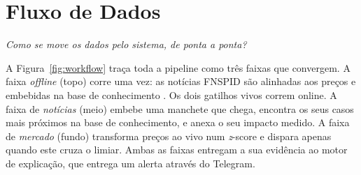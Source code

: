 \section{Fluxo de Dados}
\label{sec:investigator_flow}

\emph{Como se move os dados pelo sistema, de ponta a ponta?}

A Figura~\ref{fig:workflow} traça toda a pipeline como três faixas que convergem. A faixa \emph{offline}
(topo) corre uma vez: as notícias FNSPID são alinhadas aos preços e embebidas na base de conhecimento
\autocite{dong2024fnspid}. Os dois gatilhos vivos correm online. A faixa de \emph{notícias} (meio) embebe
uma manchete que chega, encontra os seus casos mais próximos na base de conhecimento, e anexa o seu impacto
medido. A faixa de \emph{mercado} (fundo) transforma preços ao vivo num \emph{z}-score e dispara apenas
quando este cruza o limiar. Ambas as faixas entregam a sua evidência ao motor de explicação, que entrega um
alerta através do Telegram.

